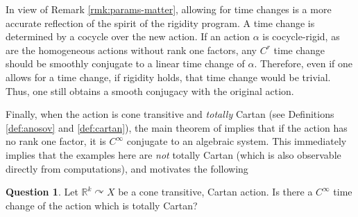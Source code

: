 \documentclass[12pt]{amsart}
\theoremstyle{definition}
\newtheorem{question}{Question}
\theoremstyle{remark}
\numberwithin{equation}{section}
\newcommand{\R}{\mathbb{R}}
\newtheorem{Structural Stability Theorem}[theorem]{Structural Stability Theorem}
\begin{document}
In view of Remark \ref{rmk:params-matter}, allowing for time changes is a more accurate reflection of the spirit of the rigidity program. A time change is determined by a cocycle over the new action. If an action $\alpha$ is cocycle-rigid, as are the homogeneous actions without rank one factors, any $C^r$ time change should be smoothly conjugate to a linear time change of $\alpha$. Therefore, even if one allows for a time change, if rigidity holds, that time change would be trivial. Thus, one still obtains a smooth conjugacy with the original action.

Finally, when the action is cone transitive and {\it totally} Cartan (see Definitions \ref{def:anosov} and \ref{def:cartan}), the main theorem of \cite{spatzier-vinhage} implies that if the action has no rank one factor, it is $C^\infty$ conjugate to an algebraic system. This immediately implies that the examples here are {\it not} totally Cartan (which is also observable directly from computations), and motivates the following

\begin{question}
Let $\R^k \curvearrowright X$ be a cone transitive, Cartan action. Is there a $C^\infty$ time change of the action which is totally Cartan?
\end{question}



\end{document}
